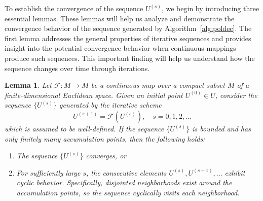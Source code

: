 \documentclass[sn-mathphys-num]{sn-jnl}%
\newtheorem{lemma}{Lemma}[section]
\theoremstyle{thmstyleone}%
\theoremstyle{thmstyletwo}%
\theoremstyle{thmstylethree}%
\begin{document}
To establish the convergence of the sequence ${U^{(s)}}$, we begin by introducing three essential lemmas. These lemmas will help us analyze and demonstrate the convergence behavior of the sequence generated by Algorithm~\ref{alg:poldec}. The first lemma addresses the general properties of iterative sequences and provides insight into the potential convergence behavior when continuous mappings produce such sequences. This important finding will help us understand how the sequence changes over time through iterations.
%
%
%
\begin{lemma}\label{lemma:Guan18}\cite[Theorem 1]{Guan18}
Let $\mathcal{F}: M \rightarrow M$ be a continuous map over a compact subset $M$ of a finite-dimensional Euclidean space. Given an initial point $U^{(0)}\in U$, consider the sequence $\{U^{(s)}\}$ generated by the iterative scheme
\[
U^{(s+1)} = \mathcal{F}(U^{(s)}), \quad s = 0, 1, 2, \ldots
\]
which is assumed to be well-defined. 
If the sequence $\{U^{(s)}\}$ is bounded and has only finitely many accumulation points, then the following holds:
\begin{enumerate}
    \item The sequence $\{U^{(s)}\}$ converges, or
    \item For sufficiently large $s$, the consecutive elements $U^{(s)}, U^{(s+1)}, \dots$ exhibit cyclic behavior. Specifically, disjointed neighborhoods exist around the accumulation points, so the sequence cyclically visits each neighborhood.
\end{enumerate}
\end{lemma}
\end{document}

